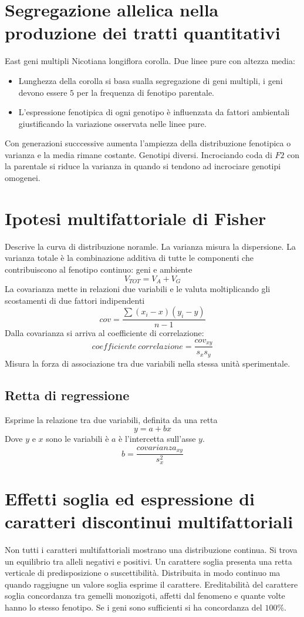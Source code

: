 \section{Segregazione allelica nella produzione dei tratti quantitativi}
East geni multipli Nicotiana longiflora corolla.
Due linee pure con altezza media:
\begin{itemize}
	\item Lunghezza della corolla si basa sualla segregazione di geni multipli, i geni devono essere $5$ per la frequenza di fenotipo parentale.
	\item L'espressione fenotipica di ogni genotipo \`e influenzata da fattori ambientali giustificando la variazione osservata nelle linee pure.
\end{itemize}
Con generazioni succcessive aumenta l'ampiezza della distribuzione fenotipica o varianza e la media rimane costante.
Genotipi diversi.
Incrociando coda di $F2$ con la parentale si riduce la varianza in quando si tendono ad incrociare genotipi omogenei.

\section{Ipotesi multifattoriale di Fisher}
Descrive la curva di distribuzione noramle.
La varianza misura la dispersione.
La varianza totale \`e la combinazione additiva di tutte le componenti che contribuiscono al fenotipo continuo: geni e ambiente 
\[V_{TOT} = V_A + V_G\]
La covarianza mette in relazioni due variabili e le valuta moltiplicando gli scostamenti di due fattori indipendenti
\[cov = \dfrac{\sum(x_i -x)(y_i - y)}{n-1}\]
Dalla covarianza si arriva al coefficiente di correlazione:
\[coefficiente\ correlazione = \dfrac{cov_{xy}}{s_xs_y}\]
Misura la forza di associazione tra due variabili nella stessa unit\`a sperimentale.

	\subsection{Retta di regressione}
	Esprime la relazione  tra due variabili, definita da una retta
	\[y = a + bx\]
	Dove $y$ e $x$ sono le variabili \`e $a$ \`e l'intercetta sull'asse $y$.
	\[b = \dfrac{covarianza_{xy}}{s^2_x}\]

\section{Effetti soglia ed espressione di caratteri discontinui multifattoriali}
Non tutti i caratteri multifattoriali mostrano una distribuzione continua.
Si trova un equilibrio tra alleli negativi e positivi.
Un carattere soglia presenta una retta verticale di predisposizione o suscettibilit\`a.
Distribuita in modo continuo ma quando raggiugne un valore soglia esprime il carattere.
Ereditabilit\`a del carattere soglia concordanza tra gemelli monozigoti, affetti dal fenomeno e quante volte hanno lo stesso fenotipo.
Se i geni sono sufficienti si ha concordanza del $100\%$.

